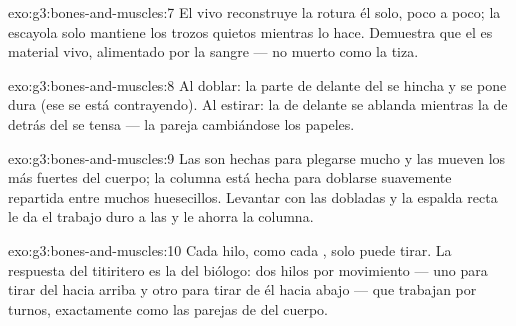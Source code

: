 \begin{solution}{exo:g3:bones-and-muscles:7}
El  vivo reconstruye la rotura él solo, poco a poco; la escayola
solo mantiene los trozos quietos mientras lo hace. Demuestra que el
 es material vivo, alimentado por la sangre --- no muerto como la
tiza.
\end{solution}

\begin{solution}{exo:g3:bones-and-muscles:8}
Al doblar: la parte de delante del  se hincha y se pone dura (ese
 se está contrayendo). Al estirar: la de delante se ablanda
mientras la de detrás del  se tensa --- la pareja cambiándose los
papeles.
\end{solution}

\begin{solution}{exo:g3:bones-and-muscles:9}
Las  son  hechas para plegarse mucho y las
mueven los  más fuertes del cuerpo; la columna está hecha para
doblarse suavemente repartida entre muchos huesecillos. Levantar con
las  dobladas y la espalda recta le da el trabajo duro a las
 y le ahorra la columna.
\end{solution}

\begin{solution}{exo:g3:bones-and-muscles:10}
Cada hilo, como cada , solo puede tirar. La respuesta del
titiritero es la del biólogo: dos hilos por movimiento --- uno para
tirar del  hacia arriba y otro para tirar de él hacia abajo ---
que trabajan por turnos, exactamente como las parejas de  del
cuerpo.
\end{solution}

